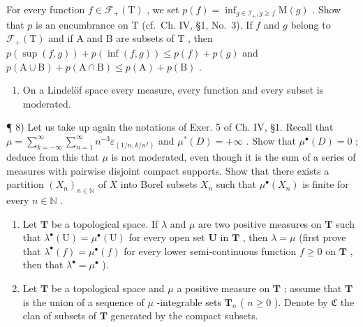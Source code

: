 For every function \(f \in \mathcal{F}_{+}(\mathrm{T})\) , we set \(p(f) = \inf_{g \in \mathcal{I}_{+}, g \geqslant f} \mathrm{M}(g)\) . Show that \(p\) is an encumbrance on \(\mathrm{T}\) (cf.~Ch. IV, §1, No.~3). If \(f\) and \(g\) belong to \(\mathcal{F}_{+}(\mathrm{T})\) and if \(\mathrm{A}\) and \(\mathrm{B}\) are subsets of \(\mathrm{T}\) , then \(p(\sup(f, g)) + p(\inf(f, g)) \leqslant p(f) + p(g)\) and \(p(\mathrm{A} \cup \mathrm{B}) + p(\mathrm{A} \cap \mathrm{B}) \leqslant p(\mathrm{A}) + p(\mathrm{B})\) .

\begin{enumerate}
\def\labelenumi{\arabic{enumi})}
\setcounter{enumi}{6}
\tightlist
\item
  On a Lindelöf space every measure, every function and every subset is moderated.
\end{enumerate}

¶ 8) Let us take up again the notations of Exer. 5 of Ch. IV, §1. Recall that \(\mu = \sum_{k=-\infty}^{\infty} \sum_{n=1}^{\infty} n^{-3} \varepsilon_{(1/n,k/n^2)}\) and \(\mu^{*}(D) = +\infty\) . Show that \(\mu^{\bullet}(D) = 0\) ; deduce from this that \(\mu\) is not moderated, even though it is the sum of a series of measures with pairwise disjoint compact supports. Show that there exists a partition \((X_n)_{n \in \mathbb{N}}\) of \(X\) into Borel subsets \(X_n\) such that \(\mu^{\bullet}(X_n)\) is finite for every \(n \in \mathbb{N}\) .

\begin{enumerate}
\def\labelenumi{\arabic{enumi})}
\setcounter{enumi}{8}
\item
  Let \(\mathbf{T}\) be a topological space. If \(\lambda\) and \(\mu\) are two positive measures on \(\mathbf{T}\) such that \(\lambda^{\bullet}(\mathrm{U}) = \mu^{\bullet}(\mathrm{U})\) for every open set \(\mathbf{U}\) in \(\mathbf{T}\) , then \(\lambda = \mu\) (first prove that \(\lambda^{\bullet}(f) = \mu^{\bullet}(f)\) for every lower semi-continuous function \(f \geqslant 0\) on \(\mathbf{T}\) , then that \(\lambda^{\bullet} = \mu^{\bullet}\) ).
\item
  Let \(\mathbf{T}\) be a topological space and \(\mu\) a positive measure on \(\mathbf{T}\) ; assume that \(\mathbf{T}\) is the union of a sequence of \(\mu\) -integrable sets \(\mathbf{T}_n\) ( \(n \geqslant 0\) ). Denote by \(\mathfrak{C}\) the clan of subsets of \(\mathbf{T}\) generated by the compact subsets.
\end{enumerate}

